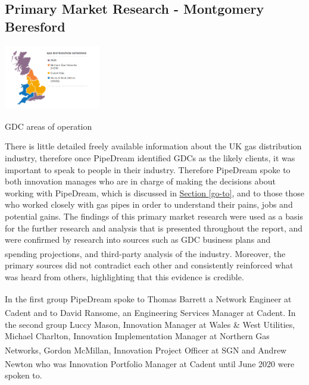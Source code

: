 \documentclass[11pt]{article}		%
\newcommand{\supercite}[1]{\textsuperscript{\cite{#1}}}		%
\newcommand{\sectref}[1]{\hyperref[#1]{Section \ref*{#1}}}     %
\begin{document}
        \subsection[Primary Market Research]{Primary Market Research - Montgomery Beresford} \label{primaryresearch}
            \begin{floatingfigure}[r]{0.4\textwidth}
    		    \centering
    	    	\includegraphics[width=0.32\textwidth]{distribution}
    		    \caption{GDC areas of operation\supercite{Gas_Distribution_Industry}}
        	    \label{distrit0}
    	    \end{floatingfigure}
   There is little detailed freely available information about the UK gas distribution industry, therefore once PipeDream identified GDCs as the likely clients, it was important to speak to people in their industry. Therefore PipeDream spoke to both innovation manages who are in charge of making the decisions about working with PipeDream, which is discussed in \sectref{go-to}, and to those those who worked closely with gas pipes in order to understand their pains, jobs and potential gains.
             The findings of this primary market research were used as a basis for the further research and analysis that is presented throughout the report, and were confirmed by research into sources such as GDC business plans and spending projections\supercite{SGN-GD2}, and third-party analysis of the industry\supercite{Gas_Distribution_Industry}. Moreover, the primary sources did not contradict each other and consistently reinforced what was heard from others, highlighting that this evidence is credible.
	        \begin{floatingfigure}[r]{0pt} \end{floatingfigure}
            \hspace*{2ex}In the first group PipeDream spoke to Thomas Barrett\supercite{Barret} a Network Engineer at Cadent and to David Ransome\supercite{Ransome}, an Engineering Services Manager at Cadent. In the second group Luccy Mason, Innovation Manager at Wales \& West Utilities, Michael Charlton, Innovation Implementation Manager at Northern Gas Networks, Gordon McMillan\supercite{McMillan}, Innovation Project Officer at SGN and Andrew Newton\supercite{Newton} who was Innovation Portfolio Manager at Cadent until June 2020 were spoken to.
\end{document}
